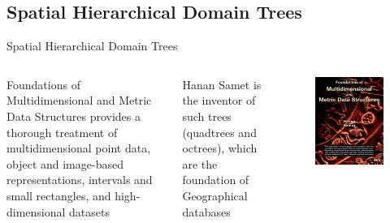 \subsection{Spatial Hierarchical Domain Trees}
\begin{frame}{Spatial Hierarchical Domain Trees}
    \begin{columns}
    Foundations of Multidimensional and
Metric Data Structures provides a
thorough treatment of
multidimensional point data, object
and image-based representations,
intervals and small rectangles, and
high-dimensional datasets

Hanan Samet is the inventor of such
trees (quadtrees and octrees), which
are the foundation of Geographical
databases  \cite{samet2006foundations}
        \begin{figure}
            \centering
            \includegraphics[width=\textwidth]{figs/HananSamet.jpg}
        \end{figure}
    \end{columns}
\end{frame}


